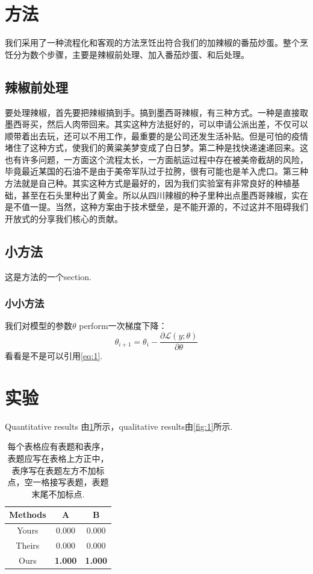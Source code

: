 \clearpage
\section{方法}
我们采用了一种流程化和客观的方法烹饪出符合我们的加辣椒的番茄炒蛋。整个烹饪分为数个步骤，主要是辣椒前处理、加入番茄炒蛋、和后处理。

\subsection{辣椒前处理}
要处理辣椒，首先要把辣椒搞到手。搞到墨西哥辣椒，有三种方式。一种是直接取墨西哥买，然后人肉带回来。其实这种方法挺好的，可以申请公派出差，不仅可以顺带着出去玩，还可以不用工作，最重要的是公司还发生活补贴。但是可怕的疫情堵住了这种方式，使我们的黄粱美梦变成了白日梦。第二种是找快递速递回来。这也有许多问题，一方面这个流程太长，一方面航运过程中存在被美帝截胡的风险，毕竟最近某国的石油不是由于美帝军队过于拉胯，很有可能也是羊入虎口。第三种方法就是自己种。其实这种方式是最好的，因为我们实验室有非常良好的种植基础，甚至在石头里种出了黄金。所以从四川辣椒的种子里种出点墨西哥辣椒，实在是不值一提。当然，这种方案由于技术壁垒，是不能开源的，不过这并不阻碍我们开放式的分享我们核心的贡献。

\subsection{小方法}
这是方法的一个section.
\subsubsection{小小方法}


我们对模型的参数$\theta$ perform一次梯度下降：
\begin{equation}
\label{eq:1}
    \theta_{i+1}=\theta_{i}-\frac{\partial \mathcal{L}(y;\theta)}{\partial \theta}
\end{equation}
看看是不是可以引用\cref{eq:1}.


\clearpage
\section{实验}
Quantitative results 由\cref{tab:1}所示，qualitative results由\cref{fig:1}所示.


\begin{table}[ht]
    \centering
    \caption{每个表格应有表题和表序，表题应写在表格上方正中，表序写在表题左方不加标点，空一格接写表题，表题末尾不加标点.}
    \label{tab:1}
    \begin{tabular}{ccc}
    \toprule
    \textbf{Methods} & \textbf{A} & \textbf{B} \\
    \midrule
    Yours & 0.000 & 0.000 \\
    Theirs & 0.000 & 0.000 \\
    Ours & \textbf{1.000} & \textbf{1.000} \\ 
    \bottomrule
    \end{tabular}
\end{table}

